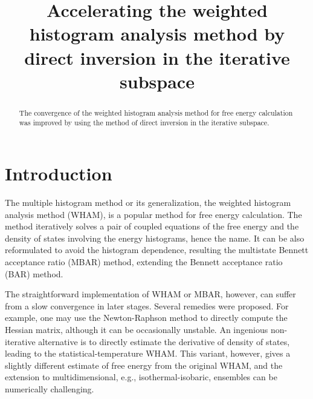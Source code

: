 \documentclass[reprint,superscriptaddress]{revtex4-1}
\begin{document}
\newcommand{\vct}[1]{\mathbf{#1}}
\newcommand{\vx}{\vct{x}}
\newcommand{\Z}{\mathcal{Z}}
\newcommand{\E}{\mathcal{E}}




\title{Accelerating the weighted histogram analysis method
by direct inversion in the iterative subspace}

\begin{abstract}
The convergence of the weighted histogram analysis method for free energy calculation
was improved by using the method of direct inversion in the iterative subspace.
\end{abstract}

\maketitle





\section{Introduction}





The multiple histogram method\cite{
ferrenberg1988, *ferrenberg1989}
or its generalization,
the weighted histogram analysis method (WHAM)\cite{
kumar1992, souaille2001, kastner2005,
chodera2007, bereau2009,
kim2011},
is a popular method
for free energy calculation.
%
The method iteratively solves a pair of coupled equations of
the free energy and the density of states
involving the energy histograms, hence the name.
%
It can be also reformulated
to avoid the histogram dependence,
resulting the
multistate Bennett acceptance ratio (MBAR) method\cite{
shirts2008},
extending the Bennett acceptance ratio (BAR) method\cite{
bennett1976}.



The straightforward implementation of WHAM or MBAR,
however, can suffer from
a slow convergence in later stages.
%
Several remedies were proposed\cite{
 shirts2008, bereau2009, kim2011}.
%
For example, one may use the Newton-Raphson method
to directly compute the Hessian matrix\cite{
shirts2008},
although it can be occasionally unstable.
%
An ingenious non-iterative alternative
is to directly estimate the derivative of density of states,
leading to the statistical-temperature WHAM\cite{
kim2011}.
%
This variant, however, gives
a slightly different estimate of free energy
from the original WHAM,
and the extension to multidimensional,
e.g., isothermal-isobaric, ensembles
can be numerically challenging\cite{kim2011}.
\end{document}
